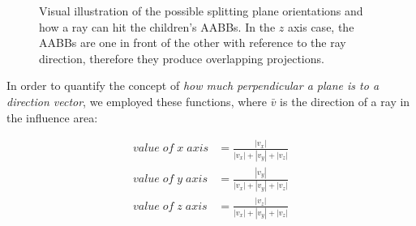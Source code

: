 \documentclass[acmtog, anonymous, review]{acmart}
\begin{document}
\begin{figure}
  \caption{Visual illustration of the possible splitting plane orientations and how a ray can hit the children's AABBs. In the $z$ axis case, the AABBs are one in front of the other with reference to the ray direction, therefore they produce overlapping projections.}
  \label{fig:ray_facing_simplest_case}
\end{figure}

In order to quantify the concept of \textit{how much perpendicular a plane is to a direction vector}, we employed these functions, where $\bar{v}$ is the direction of a ray in the influence area:

\begin{align*}
	value\;of\;x\;axis &= \frac{|v_x|}{|v_x|+|v_y|+|v_z|} \\
	value\;of\;y\;axis &= \frac{|v_y|}{|v_x|+|v_y|+|v_z|} \\
	value\;of\;z\;axis &= \frac{|v_z|}{|v_x|+|v_y|+|v_z|}
\end{align*}
\end{document}
